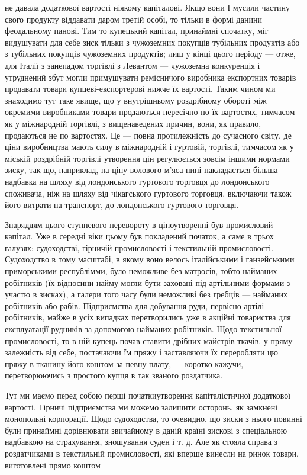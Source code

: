 \parcont{}  %
не давала додаткової вартості ніякому капіталові. Якщо вони І мусили частину свого продукту віддавати даром третій особі, то
тільки в формі данини феодальному панові. Тим то купецький капітал, принаймні спочатку, міг видушувати для себе зиск тільки
з чужоземних покупців тубільних продуктів або з тубільних покупців чужоземних продуктів; лиш у кінці цього періоду — отже,
для Італії з занепадом торгівлі з Левантом — чужоземна конкуренція і утруднений збут могли примушувати ремісничого виробника
експортних товарів продавати товари купцеві-експортерові нижче їх вартості. Таким чином ми знаходимо тут таке явище, що у
внутрішньому роздрібному обороті між окремими виробниками товари продаються пересічно по їх вартостях, тимчасом як у
міжнародній торгівлі, з вищенаведених причин, вони, як правило, продаються не по вартостях. Це — повна протилежність до
сучасного світу, де ціни виробництва мають силу в міжнародній і гуртовій, торгівлі, тимчасом як у міській роздрібній
торгівлі утворення цін регулюється зовсім іншими нормами зиску, так що, наприклад, на ціну волового м’яса нині накладається
більша надбавка на шляху від лондонського гуртового торговця до лондонського споживача, ніж на шляху від чікагського
гуртового торговця, включаючи також його витрати на транспорт, до лондонського гуртового торговця.

Знаряддям цього
ступневого перевороту в ціноутворенні був промисловий капітал. Уже в середні віки цьому був покладений початок, а саме в
трьох галузях: судоходстві, гірничій промисловості і текстильній промисловості. Судоходство в тому масштабі, в якому воно
велось італійськими і ганзейськими приморськими республімми, було неможливе без матросів, тобто найманих робітників (їх
відносини найму могли бути заховані під артільними формами з участю в зисках), а галери того часу були неможливі без гребців
— найманих робітників або рабів. Підприємства для добування руди, первісно артілі робітників, майже в усіх випадках
перетворились уже в акційні товариства для експлуатації рудників за допомогою найманих робітників. Щодо текстильної
промисловості, то в ній купець почав ставити дрібних майстрів-ткачів. у пряму залежність від себе, постачаючи їм пряжу і
заставляючи їх переробляти цю пряжу в тканину його коштом за певну плату, — коротко кажучи, перетворюючись з простого купця
в так званого роздатчика.

Тут ми маємо перед собою перші початкиутворення капіталістичної додаткової вартості. Гірничі
підприємства ми можемо залишити осторонь, як замкнені монопольні корпорації. Щодо судоходства, то очевидно, що зиски з нього
повинні були принаймні дорівнювати звичайному в даній країні зискові з спеціальною надбавкою на страхування, зношування
суден і т. д. Але як стояла справа з роздатчиками в текстильній промисловості, які вперше винесли на ринок товари,
виготовлені прямо коштом
\parbreak{}  %
